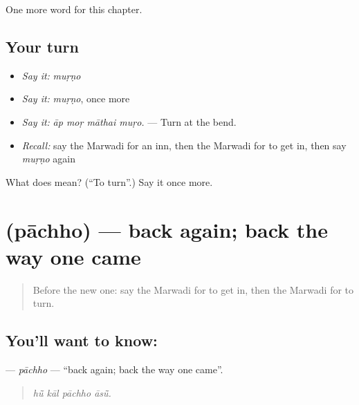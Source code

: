 \begin{grammarlens}[title={What you've built}]
One more word for this chapter.
\end{grammarlens}

\subsection*{Your turn}
\begin{itemize}
\raggedright
  \item \emph{Say it:} \emph{muṛṇo}
  \item \emph{Say it:} \emph{muṛṇo}, once more
  \item \emph{Say it:} \emph{āp moṛ māthai muṛo.} — Turn at the bend.
  \item \emph{Recall:} say the Marwadi for an inn, then the Marwadi for to get in, then say \emph{muṛṇo} again
\end{itemize}

\begin{tcolorbox}[breakable,colback=teal!4,colframe=teal!35!black,title={Before you move on}]
What does  mean? (\textquotedblleft{}To turn\textquotedblright{}.) Say it once more.
\end{tcolorbox}
\section[\texorpdfstring{\mw{पाछो} (pāchho)}{पाछो (pāchho)}]{ (pāchho) — back again; back the way one came}

\label{lesson:MW-C202-pachho}



\begin{quote}
Before the new one: say the Marwadi for to get in, then the Marwadi for to turn.
\end{quote}

\subsection*{You'll want to know: }
\textbf{} — \emph{pāchho} — \textquotedblleft{}back again; back the way one came\textquotedblright{}.

\begin{quote}
   
\end{quote}

\begin{quote}
\emph{hū̃ kāl pāchho āsū̃.}
\end{quote}


